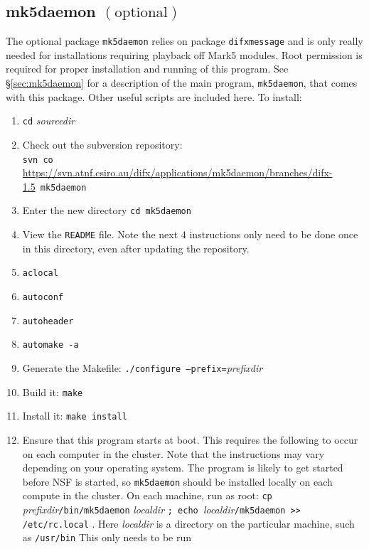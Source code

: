 
\subsection{mk5daemon {\small $\mathrm{(optional)}$}} 

\vspace{-20pt}\hspace{160pt}
\difxoneone

\vspace{7pt}

\noindent
The optional package {\tt mk5daemon} relies on package {\tt difxmessage} and is only really needed for installations requiring playback off Mark5 modules.
Root permission is required for proper installation and running of this program.
See \S\ref{sec:mk5daemon} for a description of the main program, {\tt mk5daemon}, that comes with this package.
Other useful scripts are included here.
To install:
\begin{enumerate}
\item {\tt cd} {\em sourcedir}
\item Check out the subversion repository: \\
{\tt svn co }\url{https://svn.atnf.csiro.au/difx/applications/mk5daemon/branches/difx-1.5}{\tt\ mk5daemon}
\item Enter the new directory {\tt cd mk5daemon}
\item View the {\tt README} file.  
Note the next 4 instructions only need to be done once in this directory, even after updating the repository.
\item {\tt aclocal}
\item {\tt autoconf}
\item {\tt autoheader}
\item {\tt automake -a}
\item Generate the Makefile: {\tt ./configure --prefix=}{\em prefixdir}
\item Build it: {\tt make}
\item Install it: {\tt make install}
\item Ensure that this program starts at boot.
This requires the following to occur on each computer in the cluster.
Note that the instructions may vary depending on your operating system.
The program is likely to get started before NSF is started, so {\tt mk5daemon} should be installed locally on each compute in the cluster.
On each machine, run as root: {\tt cp }{\em prefixdir}{\tt /bin/mk5daemon} {\em localdir} {\tt ; echo }{\em localdir}{\tt /mk5daemon >> /etc/rc.local} .
Here {\em localdir} is a directory on the particular machine, such as {\tt /usr/bin}
This only needs to be run
\end{enumerate}


